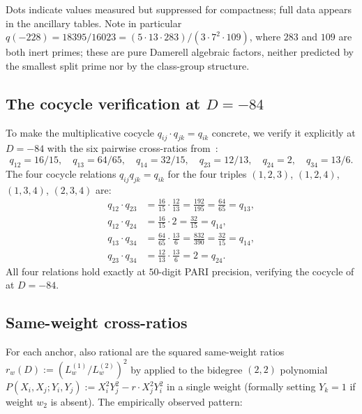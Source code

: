 Dots indicate values measured but suppressed for compactness;
full data appears in the ancillary tables. Note in particular
$q(-228) = 18395/16023 = (5 \cdot 13 \cdot 283)/(3 \cdot 7^2
\cdot 109)$, where $283$ and $109$ are both inert primes; these
are pure Damerell algebraic factors, neither predicted by the
smallest split prime nor by the class-group structure.

\subsection{The cocycle verification at $D = -84$}
\label{ss:cocycle-verification}

To make the multiplicative cocycle $q_{ij} \cdot q_{jk} = q_{ik}$
concrete, we verify it explicitly at $D = -84$ with the six
pairwise cross-ratios from~:
\[
q_{12} = 16/15, \quad q_{13} = 64/65, \quad q_{14} = 32/15,
\quad q_{23} = 12/13, \quad q_{24} = 2, \quad q_{34} = 13/6.
\]
The four cocycle relations $q_{ij} q_{jk} = q_{ik}$ for the four
triples $(1, 2, 3)$, $(1, 2, 4)$, $(1, 3, 4)$, $(2, 3, 4)$ are:
\begin{align*}
q_{12} \cdot q_{23} &= \frac{16}{15} \cdot \frac{12}{13}
= \frac{192}{195} = \frac{64}{65} = q_{13}, \\
q_{12} \cdot q_{24} &= \frac{16}{15} \cdot 2 = \frac{32}{15}
= q_{14}, \\
q_{13} \cdot q_{34} &= \frac{64}{65} \cdot \frac{13}{6}
= \frac{832}{390} = \frac{32}{15} = q_{14}, \\
q_{23} \cdot q_{34} &= \frac{12}{13} \cdot \frac{13}{6}
= 2 = q_{24}.
\end{align*}
All four relations hold exactly at $50$-digit PARI precision,
verifying the cocycle of  at $D = -84$.

\subsection{Same-weight cross-ratios}\label{ss:same-weight-empirical}

For each anchor, also rational are the squared same-weight
ratios $r_w(D) := (L_w^{(1)}/L_w^{(2)})^2$ by 
applied to the bidegree $(2, 2)$ polynomial
$P(X_i, X_j; Y_i, Y_j) := X_i^2 Y_j^2 - r \cdot X_j^2 Y_i^2$ in
a single weight (formally setting $Y_k = 1$ if weight $w_2$ is
absent). The empirically observed pattern:

